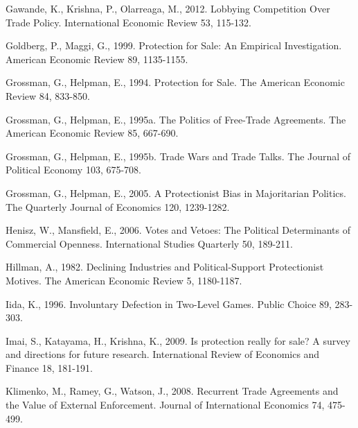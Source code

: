 \documentclass[10pt]{article}
\begin{document}
\begin{list}{}{\setlength{\leftmargin}{0.0in}\setlength{\rightmargin}{0.0in}\setlength{\itemindent}{0.0in}\setlength{\itemsep}{0.1in}}
\item Gawande, K., Krishna, P., Olarreaga, M., 2012. Lobbying Competition Over Trade Policy. International Economic Review 53, 115-132.

\item Goldberg, P., Maggi, G., 1999. Protection for Sale: An Empirical Investigation. American Economic Review 89, 1135-1155.

\item Grossman, G., Helpman, E., 1994. Protection for Sale. The American Economic Review 84, 833-850.

\item Grossman, G., Helpman, E., 1995a. The Politics of Free-Trade Agreements. The American Economic Review 85, 667-690.

\item Grossman, G., Helpman, E., 1995b. Trade Wars and Trade Talks. The Journal of Political Economy 103, 675-708.

\item Grossman, G., Helpman, E., 2005. A Protectionist Bias in Majoritarian Politics. The Quarterly Journal of Economics 120, 1239-1282.

\item Henisz, W., Mansfield, E., 2006. Votes and Vetoes: The Political Determinants of Commercial Openness. International Studies Quarterly 50, 189-211.

\item Hillman, A., 1982. Declining Industries and Political-Support Protectionist Motives. The American Economic Review 5, 1180-1187.

\item Iida, K., 1996. Involuntary Defection in Two-Level Games. Public Choice 89, 283-303.

\item Imai, S., Katayama, H., Krishna, K., 2009. Is protection really for sale? A survey and directions for future research. International Review of Economics and Finance 18, 181-191.


\item Klimenko, M., Ramey, G., Watson, J., 2008. Recurrent Trade Agreements and the Value of External Enforcement. Journal of International Economics 74, 475-499.



\end{list}
\end{document}
